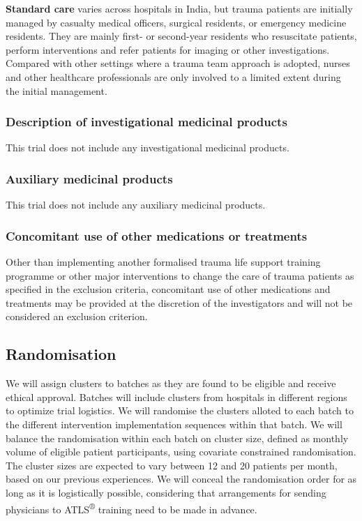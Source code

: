 \documentclass[
]{scrartcl}
\begin{document}
\textbf{Standard care} varies across hospitals in India, but trauma
patients are initially managed by casualty medical officers, surgical
residents, or emergency medicine residents. They are mainly first- or
second-year residents who resuscitate patients, perform interventions
and refer patients for imaging or other investigations. Compared with
other settings where a trauma team approach is adopted, nurses and other
healthcare professionals are only involved to a limited extent during
the initial management.

\subsubsection{Description of investigational medicinal
products}\label{description-of-investigational-medicinal-products}

This trial does not include any investigational medicinal products.

\subsubsection{Auxiliary medicinal
products}\label{auxiliary-medicinal-products}

This trial does not include any auxiliary medicinal products.

\subsubsection{Concomitant use of other medications or
treatments}\label{concomitant-use-of-other-medications-or-treatments}

Other than implementing another formalised trauma life support training
programme or other major interventions to change the care of trauma
patients as specified in the exclusion criteria, concomitant use of
other medications and treatments may be provided at the discretion of
the investigators and will not be considered an exclusion criterion.

\subsection{Randomisation}\label{randomisation}

We will assign clusters to batches as they are found to be eligible and
receive ethical approval. Batches will include clusters from hospitals
in different regions to optimize trial logistics. We will randomise the
clusters alloted to each batch to the different intervention
implementation sequences within that batch. We will balance the
randomisation within each batch on cluster size, defined as monthly
volume of eligible patient participants, using covariate constrained
randomisation. The cluster sizes are expected to vary between 12 and 20
patients per month, based on our previous experiences. We will conceal
the randomisation order for as long as it is logistically possible,
considering that arrangements for sending physicians to
ATLS\textsuperscript{®} training need to be made in advance.
\end{document}
